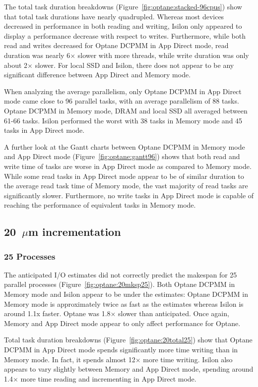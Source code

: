 The total task duration breakdowns (Figure~\ref{fig:optane:stacked-96cpus}) show that
total task durations have nearly quadrupled. Whereas most devices decreased in
performance in both reading and writing, Isilon only appeared to display a
performance decrease with respect to writes. Furthermore, while both read and
writes decreased for Optane DCPMM in App Direct mode, read duration was nearly
6$\times$ slower with more threads, while write duration was only about 2$\times$ slower. For
local SSD and Isilon, there does not appear to be any significant difference
between App Direct and Memory mode.

When analyzing the average parallelism, only Optane DCPMM in App Direct mode
came close to 96 parallel tasks, with an average parallelism of 88 tasks. Optane
DCPMM in Memory mode, DRAM and local SSD all averaged between 61-66 tasks.
Isilon performed the worst with 38 tasks in Memory mode and 45 tasks in App
Direct mode.

A further look at the Gantt charts between Optane DCPMM in Memory mode and App
Direct mode (Figure~\ref{fig:optane:gantt96}) shows that both read and write time of
tasks are worse in App Direct mode as compared to Memory mode. While some read
tasks in App Direct mode appear to be of similar duration to the average read
task time of Memory mode, the vast majority of read tasks are significantly
slower. Furthermore, no write tasks in App Direct mode is capable of reaching
the performance of equivalent tasks in Memory mode.

\subsection{20~$\mu$m \bigbrain incrementation}
\subsubsection{25 Processes}

The anticipated I/O estimates did not correctly predict the makespan for 25
parallel processes (Figure~\ref{fig:optane:20mksp25}). Both Optane DCPMM in Memory mode
and Isilon appear to be under the estimates: Optane DCPMM in Memory mode is
approximately twice as fast as the estimates whereas Isilon is around 1.1x
faster. Optane was 1.8$\times$ slower than anticipated. Once again, Memory and App
Direct mode appear to only affect performance for Optane.

Total task duration breakdowns (Figure~\ref{fig:optane:20total25}) show that Optane
DCPMM in App Direct mode spends significantly more time writing than in Memory
mode. In fact, it spends almost 12$\times$ more time writing. Isilon also appears to
vary slightly between Memory and App Direct mode, spending around 1.4$\times$ more time
reading and incrementing in App Direct mode. 

